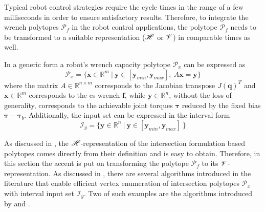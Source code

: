 
Typical robot control strategies require the cycle times in the range of a few milliseconds in order to ensure satisfactory results. Therefore, to integrate the wrench polytopes $\mathcal{P}_f$ in the robot control applications, the polytope $\mathcal{P}_f$ needs to be transformed to a suitable representation ($\mathscr{H}$ or $\mathscr{V}$) in comparable times as well.


In a generic form a robot's wrench capacity polytope $\mathcal{P}_x$ can be expressed as
\begin{equation}
    \mathcal{P}_x=\{\bm{x}\in\mathbb{R}^m~ |~\bm{y}\in[\bm{y}_{min}, \bm{y}_{max}], ~ A\bm{x} = \bm{y}\}
    \label{eq:inter_hyp_revisit_algo}
\end{equation}
where the matrix $A\in\mathbb{R}^{n\times m}$ corresponds to the Jacobian transpose $J(\bm{q})^T$ and $\bm{x}\in\mathbb{R}^m$ corresponds to the \gls{cs} wrench $\bm{f}$, while $\bm{y}\in\mathbb{R}^n$, without the loss of generality, corresponds to the achievable joint torques $\bm{\tau}$ reduced by the fixed bias $\bm{\tau} - \bm{\tau}_b$.  Additionally, the input set can be expressed in the interval form
\begin{equation}
    \mathcal{I}_y=\{\bm{y}\in\mathbb{R}^n~ |~\bm{y}\in[\bm{y}_{min}, \bm{y}_{max}]~\}
    \label{eq:interval_revisit_algo}
\end{equation}

As discussed in , the $\mathscr{H}$-representation of the intersection formulation based polytopes comes directly from their definition and is easy to obtain. Therefore, in this section the accent is put on transforming the polytope $\mathcal{P}_f$ to its $\mathscr{V}$-representation. As discussed in , there are several algorithms introduced in the literature that enable efficient vertex enumeration of intersection polytopes $\mathcal{P}_x$  with interval input set $\mathcal{I}_y$. Two of such examples are the algorithms introduced by \citet{chiacchio_evaluation_1996} and \citet{sasaki2011vertex}.

